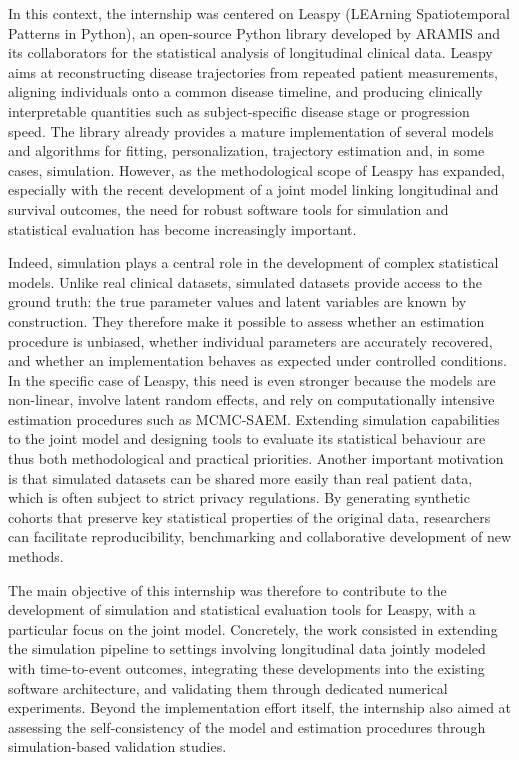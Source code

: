 \documentclass{rapportCS}
\begin{document}
In this context, the internship was centered on Leaspy (LEArning Spatiotemporal Patterns in Python), an open-source Python library developed by ARAMIS and its collaborators for the statistical analysis of longitudinal clinical data. Leaspy aims at reconstructing disease trajectories from repeated patient measurements, aligning individuals onto a common disease timeline, and producing clinically interpretable quantities such as subject-specific disease stage or progression speed. The library already provides a mature implementation of several models and algorithms for fitting, personalization, trajectory estimation and, in some cases, simulation. However, as the methodological scope of Leaspy has expanded, especially with the recent development of a joint model linking longitudinal and survival outcomes, the need for robust software tools for simulation and statistical evaluation has become increasingly important.

Indeed, simulation plays a central role in the development of complex statistical models. Unlike real clinical datasets, simulated datasets provide access to the ground truth: the true parameter values and latent variables are known by construction. They therefore make it possible to assess whether an estimation procedure is unbiased, whether individual parameters are accurately recovered, and whether an implementation behaves as expected under controlled conditions. In the specific case of Leaspy, this need is even stronger because the models are non-linear, involve latent random effects, and rely on computationally intensive estimation procedures such as MCMC-SAEM. Extending simulation capabilities to the joint model and designing tools to evaluate its statistical behaviour are thus both methodological and practical priorities. Another important motivation is that simulated datasets can be shared more easily than real patient data, which is often subject to strict privacy regulations. By generating synthetic cohorts that preserve key statistical properties of the original data, researchers can facilitate reproducibility, benchmarking and collaborative development of new methods.

The main objective of this internship was therefore to contribute to the development of simulation and statistical evaluation tools for Leaspy, with a particular focus on the joint model. Concretely, the work consisted in extending the simulation pipeline to settings involving longitudinal data jointly modeled with time-to-event outcomes, integrating these developments into the existing software architecture, and validating them through dedicated numerical experiments. Beyond the implementation effort itself, the internship also aimed at assessing the self-consistency of the model and estimation procedures through simulation-based validation studies.
\end{document}
